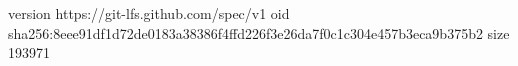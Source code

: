 version https://git-lfs.github.com/spec/v1
oid sha256:8eee91df1d72de0183a38386f4ffd226f3e26da7f0c1c304e457b3eca9b375b2
size 193971
